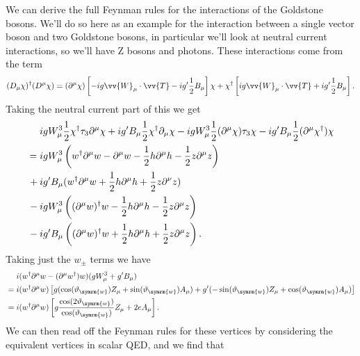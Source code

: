 \documentclass[fleqn]{NotesClass}
\newcommand{\Pparticle}[1]{\mathrm{#1}}
\newcommand{\PZ}{\ensuremath{\Pparticle{Z}}}
\newcommand{\covariantDerivative}{D}
\newcommand{\hermit}{\dagger}
\newcommand{\weinbergangle}{\vartheta_{\symrm{w}}}
\begin{document}
    We can derive the full Feynman rules for the interactions of the Goldstone bosons.
    We'll do so here as an example for the interaction between a single vector boson and two Goldstone bosons, in particular we'll look at neutral current interactions, so we'll have \PZ{} bosons and photons.
    These interactions come from the term
    \begin{equation}
        (\covariantDerivative_\mu \chi)^\hermit (\covariantDerivative^\mu \chi) = (\partial^\mu \chi)\left[ -ig\vv{W}_\mu \cdot \vv{T} - ig'\frac{1}{2}B_\mu \right]\chi + \chi^\hermit\left[ ig\vv{W}_\mu \cdot \vv{T} + ig'\frac{1}{2}B_\mu \right].
    \end{equation}
    Taking the neutral current part of this we get
    \begin{align}
        &igW^3_\mu \frac{1}{2}\chi^\hermit \tau_3 \partial^\mu \chi + ig' B_\mu \frac{1}{2}\chi^\hermit \partial_\mu \chi - igW^3_\mu\frac{1}{2}(\partial^\mu \chi)\tau_3 \chi - ig' B_\mu \frac{1}{2}(\partial^\mu \chi^\hermit) \chi \notag\\
        {}={} & ig W^3_\mu\left( w^\hermit \partial^\mu w - \partial^\mu w - \frac{1}{2}h \partial^\mu h - \frac{1}{2}z \partial^\mu z \right)\\
        {}+{} &ig' B_\mu (w^\hermit \partial^\mu w + \frac{1}{2} h \partial^\mu h + \frac{1}{2} z \partial^\nu z)\\
        {}-{} & ig W^3_\mu \left( (\partial^\mu w)^\hermit w - \frac{1}{2}h\partial^\mu h - \frac{1}{2}z\partial^\mu z \right)\\
        {}-{}& ig'B_\mu\left( (\partial^\mu w)^\hermit w + \frac{1}{2}h\partial^\mu h + \frac{1}{2}z\partial^\mu z \right).
    \end{align}
    Taking just the \(w_{\pm}\) terms we have
    \begin{align}
        & i(w^\hermit \partial^\mu w - (\partial^\mu w^\hermit)w)(gW^3_\mu + g'B_\mu)\\
        {}={} & i(w^\hermit \partial^\mu w)\left[ g(\cos(\weinbergangle) Z_\mu + \sin(\weinbergangle) A_\mu) + g'(-\sin(\weinbergangle)Z_\mu + \cos(\weinbergangle)A_\mu) \right] \notag\\
        {}={} & i(w^\hermit \partial^\mu w)\left[ g\frac{\cos(2\weinbergangle)}{\cos(\weinbergangle)} Z_\mu + 2eA_\mu \right].
    \end{align}
    We can then read off the Feynman rules for these vertices by considering the equivalent vertices in scalar QED, and we find that
\end{document}
